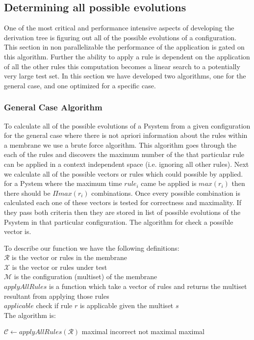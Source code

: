 \documentclass[runningheads]{llncs}
\begin{document}
\subsection{Determining all possible evolutions}

One of the most critical and performance intensive aspects of developing the derivation tree is figuring out all of the possible evolutions of a configuration. This section in non parallelizable the performance of the application is gated on this algorithm. Further the ability to apply a rule is dependent on the application of all the other rules this computation becomes a linear search to a potentially very large test set. In this section we have developed two algorithms, one for the general case, and one optimized for a specific case.

\subsubsection*{ General Case Algorithm}

To calculate all of the possible evolutions of a Psystem from a given configuration for the general case where there is not apriori information about the rules within a membrane we use a brute force algorithm. This algorithm goes through the each of the rules and discovers the maximum number of the that particular rule can be applied in a context independent space (i.e. ignoring all other rules). Next we calculate all of the possible vectors or rules which could possible by applied. for a Pystem where the maximum time $rule_i$ came be applied is $max(r_i)$ then there should be $\Pi max(r_i)$ combinations. Once every possible combination is calculated each one of these vectors is tested for correctness and maximality. If they pass both criteria then they are stored in list of possible evolutions of the Psystem in that particular configuration. The algorithm for check a possible vector is.

To describe our function we have the following definitions:\\
$\mathcal{R}$ is the vector or rules in the membrane \\
$\mathcal{X}$ is the vector or rules under test \\
$\mathcal{M}$ is the configuration (multiset) of the membrane\\
$applyAllRules$ is a function which take a vector of rules and returns the multiset resultant from applying those rules\\
$applicable$ check if rule $r$ is applicable given the multiset $s$\\
The algorithm is:
\begin{algorithmic}
\STATE $\mathcal{C} \leftarrow applyAllRules(\mathcal{R})$
    \RETURN maximal
\ELSE
        	\RETURN incorrect
        \ENDIF
    \ENDFOR
        	\RETURN not maximal
        \ENDIF
    \ENDFOR
     	\RETURN maximal
\ENDIF
\end{algorithmic}  
\end{document}

